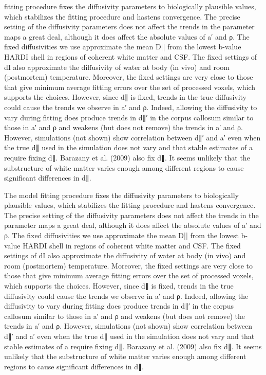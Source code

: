 fitting procedure fixes the diffusivity parameters to biologically plausible values, which stabilizes the fitting procedure and hastens convergence. The precise setting of the diffusivity parameters does not affect the trends in the parameter maps a great deal, although it does affect the absolute values of a′ and ρ. The fixed diffusivities we use approximate the mean D|| from the lowest b-value HARDI shell in regions of coherent white matter and CSF. The fixed settings of dI also approximate the diffusivity of water at body (in vivo) and room (postmortem) temperature. Moreover, the fixed settings are very close to those that give minimum average fitting errors over the set of processed voxels, which supports the choices. However, since d∥ is fixed, trends in the true diffusivity could cause the trends we observe in a′ and ρ. Indeed, allowing the diffusivity to vary during fitting does produce trends in d∥′ in the corpus callosum similar to those in a′ and ρ and weakens (but does not remove) the trends in a′ and ρ. However, simulations (not shown) show correlation between d∥′ and a′ even when the true d∥ used in the simulation does not vary and that stable estimates of a require fixing d∥. Barazany et al. (2009) also fix d∥. It seems unlikely that the substructure of white matter varies enough among different regions to cause significant differences in d∥.




The model fitting procedure fixes the diffusivity parameters to biologically plausible values, which stabilizes the fitting procedure and hastens convergence. The precise setting of the diffusivity parameters does not affect the trends in the parameter maps a great deal, although it does affect the absolute values of a′ and ρ. The fixed diffusivities we use approximate the mean D|| from the lowest b-value HARDI shell in regions of coherent white matter and CSF. The fixed settings of dI also approximate the diffusivity of water at body (in vivo) and room (postmortem) temperature. Moreover, the fixed settings are very close to those that give minimum average fitting errors over the set of processed voxels, which supports the choices. However, since d∥ is fixed, trends in the true diffusivity could cause the trends we observe in a′ and ρ. Indeed, allowing the diffusivity to vary during fitting does produce trends in d∥′ in the corpus callosum similar to those in a′ and ρ and weakens (but does not remove) the trends in a′ and ρ. However, simulations (not shown) show correlation between d∥′ and a′ even when the true d∥ used in the simulation does not vary and that stable estimates of a require fixing d∥. Barazany et al. (2009) also fix d∥. It seems unlikely that the substructure of white matter varies enough among different regions to cause significant differences in d∥.


